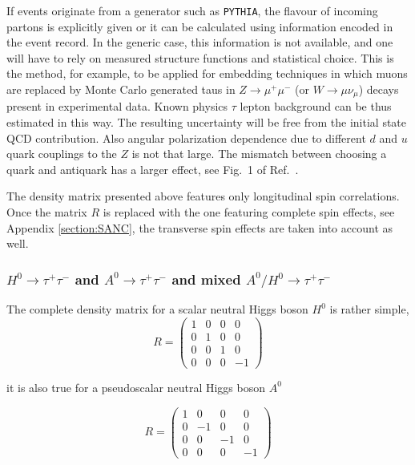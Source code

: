 \documentclass[]{Tauola_interface_design}
\begin{document}
If events originate from a generator such as {\tt PYTHIA}, 
the flavour of incoming partons is explicitly given or it 
can be calculated using information encoded in the event record. 
In the generic case, this information is not available, and one will have to rely on  measured structure 
functions and statistical choice. This is the method, for example,
to be applied for embedding techniques in which muons are replaced
by Monte Carlo generated taus in $Z\to \mu^+ \mu^-$ (or $W \to \mu
\nu_\mu$) decays present in experimental data. Known physics $\tau$ lepton background can be thus 
estimated in this way.
The resulting 
uncertainty will be free from the initial state QCD contribution. Also angular polarization dependence 
due to different  $d$ and $u$ quark
couplings to the $Z$ is not that large. The mismatch between choosing a quark
and antiquark has a larger effect, see Fig.~1  of Ref.~\cite{Pierzchala:2001gc}. 


The density matrix presented above features only longitudinal spin correlations. 
Once the matrix $R$ is replaced with the one featuring complete spin effects,
 see Appendix \ref{section:SANC}, the transverse spin effects are taken into account as well.


\subsubsection{$H^0 \rightarrow \tau^+ \tau^-$ and $A^0 \rightarrow \tau^+ \tau^-$ and mixed $A^0/H^0 \rightarrow \tau^+ \tau^-$}
The complete density matrix for a scalar neutral Higgs boson $H^0$ is rather simple,
\[R=\begin{pmatrix} 
1 & 0 & 0 & 0 \\
0 & 1 & 0 & 0 \\
0 & 0 & 1 & 0 \\
0 & 0 & 0 & -1 
\end{pmatrix}\]

it is also true for a pseudoscalar neutral Higgs boson $A^0$


\[R=\begin{pmatrix} 
1 & 0 & 0 & 0 \\
0 & -1 & 0 & 0 \\
0 & 0 & -1 & 0 \\
0 & 0 & 0 & -1 
\end{pmatrix}\]
\end{document}
